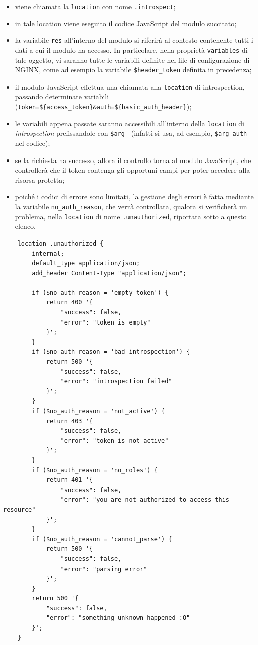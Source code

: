 \begin{itemize}
    \item viene chiamata la \verb|location| con nome \verb|.introspect|;
    \item in tale location viene eseguito il codice JavaScript del modulo succitato;
    \item la variabile \verb|res| all'interno del modulo si riferirà al contesto contenente tutti i dati a cui il modulo ha accesso. In particolare, nella proprietà \verb|variables| di tale oggetto, vi saranno tutte le variabili definite nel file di configurazione di NGINX, come ad esempio la variabile \verb|$header_token| definita in precedenza;
    \item il modulo JavaScript effettua una chiamata alla \verb|location| di introspection, passando determinate variabili (\verb|token=${access_token}&auth=${basic_auth_header}|);
    \item le variabili appena passate saranno accessibili all'interno della \verb|location| di \textit{introspection} prefissandole con \verb|$arg_| (infatti si usa, ad esempio, \verb|$arg_auth| nel codice);
    \item se la richiesta ha successo, allora il controllo torna al modulo JavaScript, che controllerà che il token contenga gli opportuni campi per poter accedere alla risorsa protetta;
    \item poiché i codici di errore sono limitati, la gestione degli errori è fatta mediante la variabile \verb|no_auth_reason|, che verrà controllata, qualora si verificherà un problema, nella \verb|location| di nome \verb|.unauthorized|, riportata sotto a questo elenco. 
\end{itemize}
\begin{verbatim}
    location .unauthorized {
        internal;
        default_type application/json;
        add_header Content-Type "application/json";
    
        if ($no_auth_reason = 'empty_token') {
            return 400 '{
                "success": false,
                "error": "token is empty"
            }';
        }
        if ($no_auth_reason = 'bad_introspection') {
            return 500 '{
                "success": false,
                "error": "introspection failed"
            }';
        }
        if ($no_auth_reason = 'not_active') {
            return 403 '{
                "success": false,
                "error": "token is not active"
            }';
        }
        if ($no_auth_reason = 'no_roles') {
            return 401 '{
                "success": false,
                "error": "you are not authorized to access this resource"
            }';
        }
        if ($no_auth_reason = 'cannot_parse') {
            return 500 '{
                "success": false,
                "error": "parsing error"
            }';
        }
        return 500 '{
            "success": false,
            "error": "something unknown happened :O"
        }';
    }
\end{verbatim}
